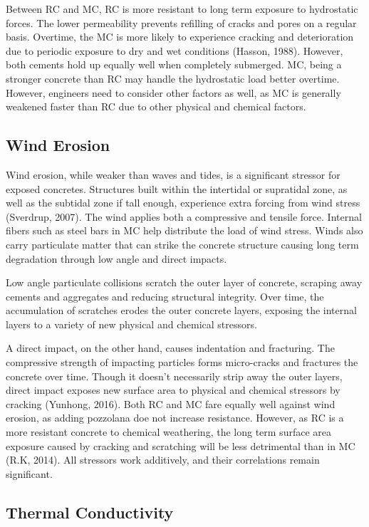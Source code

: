 \documentclass[12pt]{article}
\begin{document}
Between RC and MC, RC is more resistant to long term exposure to hydrostatic forces. The lower permeability prevents refilling of cracks and pores on a regular basis. Overtime, the MC is more likely to experience cracking and deterioration due to periodic exposure to dry and wet conditions (Hasson, 1988). However, both cements hold up equally well when completely submerged. MC, being a stronger concrete than RC may handle the hydrostatic load better overtime. However, engineers need to consider other factors as well, as MC is generally weakened faster than RC due to other physical and chemical factors. 

\subsection*{Wind Erosion}

Wind erosion, while weaker than waves and tides, is a significant stressor for exposed concretes. Structures built within the intertidal or supratidal zone, as well as the subtidal zone if tall enough, experience extra forcing from wind stress (Sverdrup, 2007). The wind applies both a compressive and tensile force. Internal fibers such as steel bars in MC help distribute the load of wind stress. Winds also carry particulate matter that can strike the concrete structure causing long term degradation through low angle and direct impacts. 

Low angle particulate collisions scratch the outer layer of concrete, scraping away cements and aggregates and reducing structural integrity. Over time, the accumulation of scratches erodes the outer concrete layers, exposing the internal layers to a variety of new physical and chemical stressors. 

A direct impact, on the other hand, causes indentation and fracturing. The compressive strength of impacting particles forms micro-cracks and fractures the concrete over time. Though it doesn't necessarily strip away the outer layers, direct impact exposes new surface area to physical and chemical stressors by cracking (Yunhong, 2016). Both RC and MC fare equally well against wind erosion, as adding pozzolana doe not increase resistance. However, as RC is a more resistant concrete to chemical weathering, the long term surface area exposure caused by cracking and scratching will be less detrimental than in MC (R.K, 2014). All stressors work additively, and their correlations remain significant. 

\subsection*{Thermal Conductivity}
\end{document}
